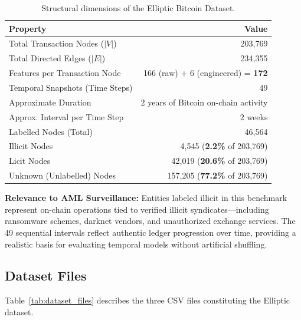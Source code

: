 \begin{table}[!htbp]
\centering
\caption[Elliptic Dataset Statistics]{Structural dimensions of the Elliptic Bitcoin Dataset.}
\label{tab:dataset_stats}
\begin{tabular}{lr}
\toprule
\textbf{Property} & \textbf{Value} \\
\midrule
Total Transaction Nodes ($|V|$) & 203,769 \\
Total Directed Edges ($|E|$) & 234,355 \\
Features per Transaction Node & 166 (raw) + 6 (engineered) = \textbf{172} \\
Temporal Snapshots (Time Steps) & 49 \\
Approximate Duration & 2 years of Bitcoin on-chain activity \\
Approx. Interval per Time Step & 2 weeks \\
\midrule
Labelled Nodes (Total) & 46,564 \\
Illicit Nodes & 4,545 (\textbf{2.2\%} of 203,769) \\
Licit Nodes & 42,019 (\textbf{20.6\%} of 203,769) \\
Unknown (Unlabelled) Nodes & 157,205 (\textbf{77.2\%} of 203,769) \\
\bottomrule
\end{tabular}
\end{table}

\vspace{0.5em}
\noindent \textbf{Relevance to AML Surveillance:} Entities labeled illicit in this benchmark represent on-chain operations tied to verified illicit syndicates—including ransomware schemes, darknet vendors, and unauthorized exchange services. The 49 sequential intervals reflect authentic ledger progression over time, providing a realistic basis for evaluating temporal models without artificial shuffling.

\subsection{Dataset Files}
\label{subsec:dataset_files}

Table~\ref{tab:dataset_files} describes the three CSV files constituting the Elliptic dataset.

